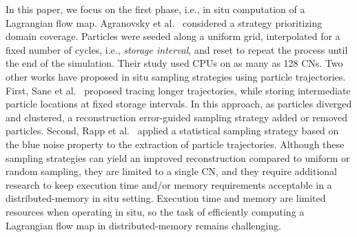In this paper, we focus on the first phase, i.e., in situ computation of a Lagrangian flow map.
%
Agranovsky et al.~\cite{agranovsky2014improved} considered a strategy prioritizing domain coverage.
%
Particles were seeded along a uniform grid, interpolated for a fixed number of cycles, i.e., \textit{storage interval}, and reset to repeat the process until the end of the simulation.
%
Their study used CPUs on as many as 128 CNs.
%
Two other works have proposed in situ sampling strategies using particle trajectories. 
%
First, Sane et al.~\cite{sane2019interpolation} proposed tracing longer trajectories, while storing intermediate particle locations at fixed storage intervals. 
%
In this approach, as particles diverged and clustered, a reconstruction error-guided sampling strategy added or removed particles.
%
%
%
Second, Rapp et al.~\cite{rapp2019void} applied a statistical sampling strategy based on the blue noise property to the extraction of particle trajectories. 
%
%
Although these sampling strategies can yield an improved reconstruction compared to uniform or random sampling, they are limited to a single CN, and they require additional research to keep execution time and/or memory requirements acceptable in a distributed-memory in situ setting. 
%
%
Execution time and memory are limited resources when operating in situ, so the task of efficiently computing a Lagrangian flow map in distributed-memory remains challenging.

